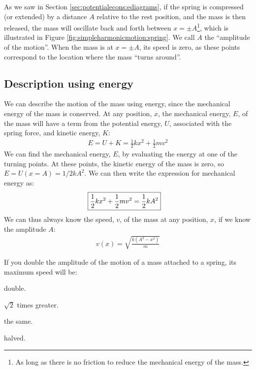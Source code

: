 As we saw in Section \ref{sec:potentialecons:ediagrams}, if the spring is compressed  (or extended) by a distance $A$ relative to the rest position, and the mass is then released, the mass will oscillate back and forth between $x=\pm A$\footnote{As long as there is no friction to reduce the mechanical energy of the mass.}, which is illustrated in Figure \ref{fig:simpleharmonicmotion:spring}. We call $A$ the ``amplitude of the motion''. When the mass is at $x=\pm A$, its speed is zero, as these points correspond to the location where the mass ``turns around''.

\subsection{Description using energy}
We can describe the motion of the mass using energy, since the mechanical energy of the mass is conserved. At any position, $x$, the mechanical energy, $E$, of the mass will have a term from the potential energy, $U$, associated with the spring force, and kinetic energy, $K$:
\begin{align*}
E = U + K =\frac{1}{2}kx^2 + \frac{1}{2}mv^2
\end{align*}
We can find the mechanical energy, $E$, by evaluating the energy at one of the turning points. At these points, the  kinetic energy of the mass is zero, so $E=U(x=A)=1/2kA^2$. We can then write the expression for mechanical energy as:
\begin{align}
\Aboxed{\frac{1}{2}kx^2 + \frac{1}{2}mv^2&= \frac{1}{2}kA^2}
\end{align}
We can thus always know the speed, $v$, of the mass at any position, $x$, if we know the amplitude $A$:
\begin{align*}
v(x) = \sqrt{\frac{k(A^2-x^2)}{m}}
\end{align*}

\begin{checkpoint}
\begin{MCquestion}{If you double the amplitude of the motion of a mass attached to a spring, its maximum speed will be:}
\item double.\correct
\item $\sqrt 2$ times greater. 
\item the same.
\item halved.
\end{MCquestion}
\end{checkpoint}

